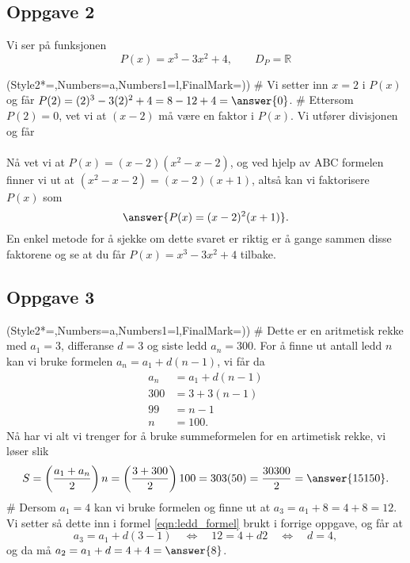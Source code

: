 \subsection*{Oppgave 2}
Vi ser på funksjonen
\begin{equation*}
	P(x) = x^3 - 3x^2 + 4, \qquad D_{P} = \mathbb{R}
\end{equation*}
\begin{easylist}[enumerate]
\ListProperties(Style2*=,Numbers=a,Numbers1=l,FinalMark={)})
# Vi setter inn $x=2$ i $P(x)$ og får $P(2) = (2)^3 - 3(2)^2 + 4 = 8 - 12 + 4 = \answer{0}$.
# Ettersom $P(2) = 0$, vet vi at $(x-2)$ må være en faktor i $P(x)$.
Vi utfører divisjonen og får \\
 \\
Nå vet vi at $P(x) = (x-2)(x^2 - x - 2)$, og ved hjelp av 
ABC formelen finner vi ut at $(x^2 - x - 2) = (x-2)(x+1)$,
altså kan vi faktorisere $P(x)$ som
\begin{equation*}
	\answer{P(x) = (x-2)^2 (x+1)}.
\end{equation*}
En enkel metode for å sjekke om dette svaret er riktig er å gange sammen disse faktorene og se at du får $P(x) = x^3 - 3x^2 + 4$ tilbake.

\end{easylist}


\subsection*{Oppgave 3}
\begin{easylist}[enumerate]
	\ListProperties(Style2*=,Numbers=a,Numbers1=l,FinalMark={)})
	# Dette er en aritmetisk rekke med $a_1 = 3$, differanse $d=3$
	og siste ledd $a_n = 300$. For å finne ut antall ledd $n$ kan
	vi bruke formelen $a_n = a_1 + d(n-1)$, vi får da
	\begin{align}
		\label{eqn:ledd_formel}a_n &= a_1 + d(n-1) \\
		\nonumber 300 &= 3 + 3(n-1) \\
		\nonumber 99 &= n-1 \\
		\nonumber n &= 100. 
	\end{align}
	Nå har vi alt vi trenger for å bruke summeformelen for en artimetisk
	rekke, vi løser slik
	\begin{equation*}
		S = \left(\frac{a_1 + a_n}{2}\right)n 
		= \left(\frac{3 + 300}{2}\right)100
		= 303(50) = \frac{30300}{2} = \answer{15150}.
	\end{equation*}
	# Dersom $a_1 = 4$ kan vi bruke formelen og finne ut at $a_3 = a_1 + 8 = 4 + 8 = 12$.
	Vi setter så dette inn i formel \eqref{eqn:ledd_formel} brukt i forrige oppgave, og får at 
	\begin{equation*}
		a_3 = a_1 + d(3 -1) \quad \Leftrightarrow 
		\quad 12 = 4 + d 2  \quad \Leftrightarrow 
		\quad d = 4,
	\end{equation*}
	og da må $a_2 = a_1 + d = 4 + 4 = \answer{8}$.
\end{easylist}



